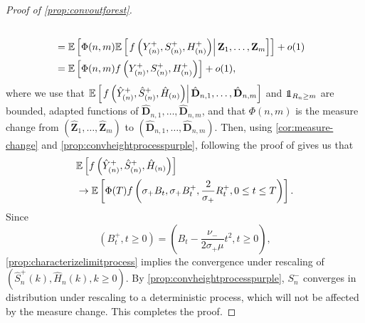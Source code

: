 \begin{proof}[Proof of \cref{prop:convoutforest}]
\begin{align*}
 \\&={\mathbb E}\left[ \Phi(n,m){\mathbb E}\left[\left.f\left(Y^+_{(n)}, S^+_{(n)},  H^+_{(n)}\right)\right| \mathbf{Z}_1,\dots, \mathbf{Z}_m\right]\right]+o(1)\\&={\mathbb E}\left[ \Phi(n,m)f\left(Y^+_{(n)},S^+_{(n)},  H^+_{(n)}\right)\right]+o(1),
\end{align*}
where we use that ${\mathbb E}\left[\left. f\left(\hat{Y}^+_{(n)},\hat{S}^+_{(n)},  \hat{H}_{(n)}\right)\right| \hat{\mathbf{D}}_{n,1},\dots, \hat{\mathbf{D}}_{n,m}\right]$ and $\one_{R_n\geq m}$ are bounded, adapted functions of $\hat{\mathbf{D}}_{n,1},\dots, \hat{\mathbf{D}}_{n,m}$, and that $\Phi(n,m)$ is the measure change from  $(\hat{\mathbf{Z}}_{1},\dots, \hat{\mathbf{Z}}_{m})$ to $(\hat{\mathbf{D}}_{n,1},\dots, \hat{\mathbf{D}}_{n,m})$. Then, using \cref{cor:measure-change} and \cref{prop:convheightprocesspurple}, following the proof of \cite[Theorem 4.1]{conchon--kerjanStableGraphMetric2020} gives us that 
\begin{align*}
    &{\mathbb E}\left[f\left(\hat{Y}^+_{(n)},\hat{S}^+_{(n)},  \hat{H}_{(n)}\right) \right]\\
    &\to {\mathbb E}\left[\Phi(T)f\left(\sigma_+ B_t,\sigma_+ B^+_t,\frac{2}{\sigma_+}R^+_t,0\leq t \leq T\right)\right].
\end{align*}
Since $$(B^+_t,t\geq 0)=\left(B_t-\frac{\nu_-}{2\sigma_+ \mu}t^2,t\geq 0\right),$$
 \cref{prop:characterizelimitprocess} implies the convergence under rescaling of $(\hat{S}^+_n(k),\hat{H}_n(k),k\geq 0)$. By \cref{prop:convheightprocesspurple}, $S^{-}_n$ converges in distribution under rescaling to a deterministic process, which will not be affected by the measure change. This completes the proof. 
\end{proof}

